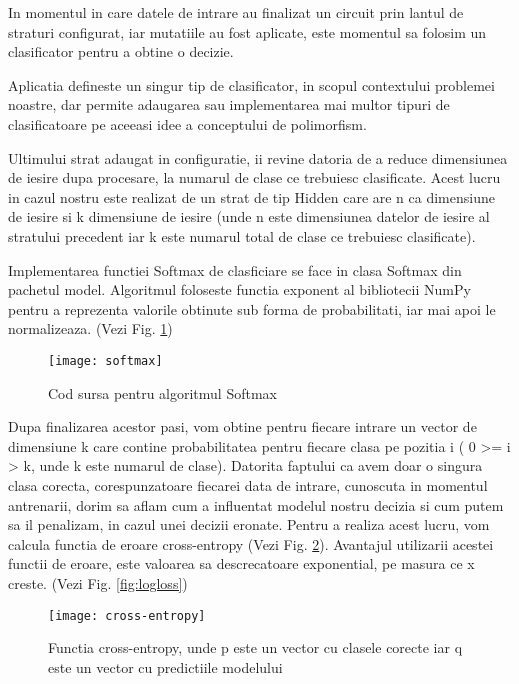 	In momentul in care datele de intrare au finalizat un circuit prin lantul de straturi configurat, iar mutatiile au fost aplicate, este momentul sa folosim un clasificator pentru a obtine o decizie. 
	
	Aplicatia defineste un singur tip de clasificator, in scopul contextului problemei noastre, dar permite adaugarea sau implementarea mai multor tipuri de clasificatoare pe aceeasi idee a conceptului de polimorfism. 
	
	Ultimului strat adaugat in configuratie, ii revine datoria de a reduce dimensiunea de iesire dupa procesare, la numarul de clase ce trebuiesc clasificate. Acest lucru in cazul nostru este realizat de un strat de tip Hidden care are n ca dimensiune de iesire si k dimensiune de iesire (unde n este dimensiunea datelor de iesire al stratului precedent iar k este numarul total de clase ce trebuiesc clasificate).
	 
	Implementarea functiei Softmax de clasficiare se face in clasa Softmax din pachetul model. Algoritmul foloseste functia exponent al bibliotecii NumPy pentru a reprezenta valorile obtinute sub forma de probabilitati, iar mai apoi le normalizeaza. (Vezi Fig. \ref{fig:softmax})
	
	\vfill
	
	\begin{figure}[H]
		\texttt{[image: softmax]}
		\caption{\label{fig:softmax} Cod sursa pentru algoritmul Softmax}
	\end{figure}

	\newpage
	
	Dupa finalizarea acestor pasi, vom obtine pentru fiecare intrare un vector de dimensiune k care contine probabilitatea pentru fiecare clasa pe pozitia i ( 0 >= i > k, unde k este numarul de clase). Datorita faptului ca avem doar o singura clasa corecta, corespunzatoare fiecarei data de intrare, cunoscuta in momentul antrenarii, dorim sa aflam cum a influentat modelul nostru decizia si cum putem sa il penalizam, in cazul unei decizii eronate. Pentru a realiza acest lucru, vom calcula functia de eroare cross-entropy (Vezi Fig. \ref{fig:cross-entropy}). Avantajul utilizarii acestei functii de eroare, este valoarea sa descrecatoare exponential, pe masura ce x creste. (Vezi Fig. \ref{fig:logloss})
	
	\begin{figure}[H]
		\texttt{[image: cross-entropy]}
		\caption{\label{fig:cross-entropy} Functia cross-entropy, unde p este un vector cu clasele corecte iar q este un vector cu predictiile modelului}
	\end{figure}	
	
